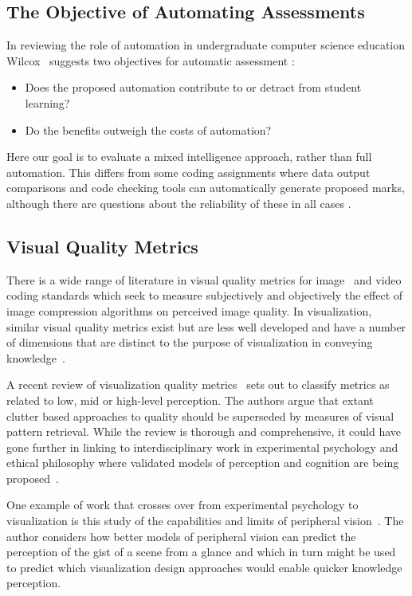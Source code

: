 \subsection{The Objective of Automating Assessments}

In reviewing the role of automation in undergraduate computer science education Wilcox~\cite{Wilcox2015} suggests two objectives for automatic assessment :
\begin{itemize}
    \item Does the proposed automation contribute to or detract from student learning?
    \item Do the benefits outweigh the costs of automation?
\end{itemize} 

Here our goal is to evaluate a mixed intelligence approach, rather than full automation. This differs from some coding assignments where data output comparisons and code checking tools can automatically generate proposed marks, although there are questions about the reliability of these in all cases \cite{wrenn2018}.

\subsection{Visual Quality Metrics}
There is a wide range of literature in visual quality metrics for image~\cite{Zhai2020} and video~\cite{Maia2015} coding standards which seek to measure subjectively and objectively the effect of image compression algorithms on perceived image quality. In visualization, similar visual quality metrics exist but are less well developed and have a number of dimensions that are distinct to the purpose of visualization in conveying knowledge~\cite{carpendale2008}.

A recent review of visualization quality metrics~\cite{Behrisch_VizQM_2018} sets out to classify metrics as related to low, mid or high-level perception. The authors argue that extant clutter based approaches to quality should be superseded by measures of visual pattern retrieval. While the review is thorough and comprehensive, it could have gone further in linking to interdisciplinary work in experimental psychology and ethical philosophy where validated models of perception and cognition are being proposed~\cite{burns2020}. 

One example of work that crosses over from experimental psychology to visualization is this study of the capabilities and limits of peripheral vision~\cite{rosenholtz2016}. The author considers how better models of peripheral vision can predict the perception of the gist of a scene from a glance and which in turn might be used to predict which visualization design approaches would enable quicker knowledge perception.

